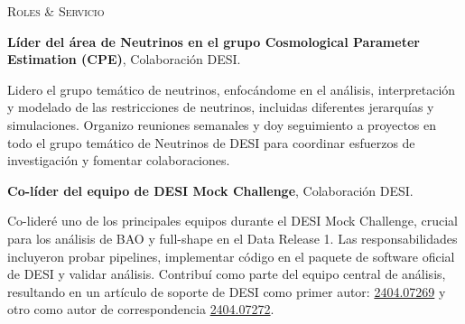 \begin{rubric}{\faCogs \textsc{Roles \& Servicio}}

\entry*[2024-2025]%
\textbf{Líder del área de Neutrinos en el grupo Cosmological Parameter Estimation (CPE)}, Colaboración DESI. \par
Lidero el grupo temático de neutrinos, enfocándome en el análisis, interpretación y modelado de las restricciones de neutrinos, incluidas diferentes jerarquías y simulaciones. Organizo reuniones semanales y doy seguimiento a proyectos en todo el grupo temático de Neutrinos de DESI para coordinar esfuerzos de investigación y fomentar colaboraciones.

\entry*[2023-2024]%
\textbf{Co-líder del equipo de DESI Mock Challenge}, Colaboración DESI. \par
Co-lideré uno de los principales equipos durante el DESI Mock Challenge, crucial para los análisis de BAO y full-shape en el Data Release 1. Las responsabilidades incluyeron probar pipelines, implementar código en el paquete de software oficial de DESI y validar análisis. Contribuí como parte del equipo central de análisis, resultando en un artículo de soporte de DESI como primer autor: \href{https://arxiv.org/abs/2404.07269}{2404.07269} y otro como autor de correspondencia \href{https://arxiv.org/abs/2404.07272}{2404.07272}.

\end{rubric}
